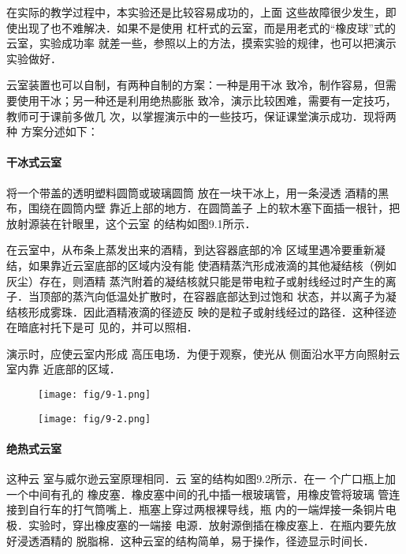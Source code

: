在实际的教学过程中，本实验还是比较容易成功的，上面
这些故障很少发生，即使出现了也不难解决．如果不是使用
杠杆式的云室，而是用老式的“橡皮球”式的云室，实验成功率
就差一些，参照以上的方法，摸索实验的规律，也可以把演示
实验做好．

云室装置也可以自制，有两种自制的方案：一种是用干冰
致冷，制作容易，但需要使用干冰；另一种还是利用绝热膨胀
致冷，演示比较困难，需要有一定技巧，教师可于课前多做几
次，以掌握演示中的一些技巧，保证课堂演示成功．现将两种
方案分述如下：

\paragraph{干冰式云室} 将一个带盖的透明塑料圆筒或玻璃圆筒
放在一块干冰上，用一条浸透
酒精的黑布，围绕在圆筒内壁
靠近上部的地方．在圆筒盖子
上的软木塞下面插一根针，把
放射源装在针眼里，这个云室
的结构如图9.1所示．

在云室中，从布条上蒸发出来的酒精，到达容器底部的冷
区域里遇冷要重新凝结，如果靠近云室底部的区域内没有能
使酒精蒸汽形成液滴的其他凝结核（例如灰尘）存在，则酒精
蒸汽附着的凝结核就只能是带电粒子或射线经过时产生的离
子．当顶部的蒸汽向低温处扩散时，在容器底部达到过饱和
状态，并以离子为凝结核形成雾珠．因此酒精液滴的径迹反
映的是粒子或射线经过的路径．这种径迹在暗底衬托下是可
见的，并可以照相．

演示时，应使云室内形成
高压电场．为便于观察，使光从
侧面沿水平方向照射云室内靠
近底部的区域．

\begin{figure}[htp]\centering
    \begin{minipage}[t]{0.48\textwidth}
    \centering
\texttt{[image: fig/9-1.png]}
    \caption{}
    \end{minipage}
    \begin{minipage}[t]{0.48\textwidth}
    \centering
\texttt{[image: fig/9-2.png]}
    \caption{}
    \end{minipage}
    \end{figure}

\paragraph{绝热式云室} 这种云
室与威尔逊云室原理相同．云
室的结构如图9.2所示．在一
个广口瓶上加一个中间有孔的
橡皮塞．橡皮塞中间的孔中插一根玻璃管，用橡皮管将玻璃
管连接到自行车的打气筒嘴上．瓶塞上穿过两根裸导线，瓶
内的一端焊接一条铜片电极．实验时，穿出橡皮塞的一端接
电源．放射源倒插在橡皮塞上．在瓶内要先放好浸透酒精的
脱脂棉．这种云室的结构简单，易于操作，径迹显示时间长．

